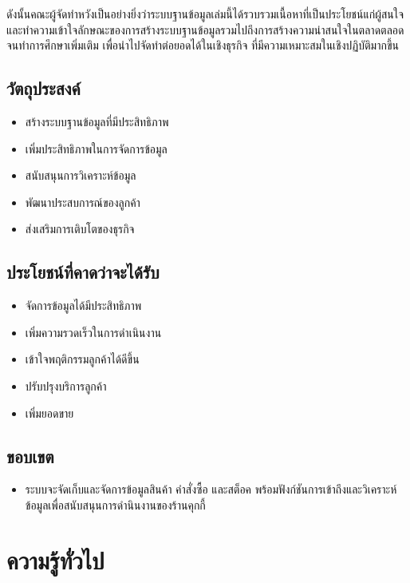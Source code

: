 \documentclass{report}
\begin{document}
ดังนั้นคณะผู้จัดทําหวังเป็นอย่างยิ่งว่าระบบฐานข้อมูลเล่มนี้ได้รวบรวมเนื้อหาที่เป็นประโยชน์แก่ผู้สนใจ และทําความเข้าใจลักษณะของการสร้างระบบฐานข้อมูลรวมไปถึงการสร้างความน่าสนใจในตลาดตลอดจนทําการศึกษาเพิ่มเติม เพื่อนำไปจัดทำต่อยอดได้ในเชิงธุรกิจ ที่มีความเหมาะสมในเชิงปฏิบัติมากขึ้น

\section{วัตถุประสงค์}
\begin{itemize} 
	\item สร้างระบบฐานข้อมูลที่มีประสิทธิภาพ
	\item เพิ่มประสิทธิภาพในการจัดการข้อมูล
	\item สนับสนุนการวิเคราะห์ข้อมูล
	\item พัฒนาประสบการณ์ของลูกค้า
	\item ส่งเสริมการเติบโตของธุรกิจ
\end{itemize}
\section{ประโยชน์ที่คาดว่าจะได้รับ}
\begin{itemize}
    \item จัดการข้อมูลได้มีประสิทธิภาพ
    \item เพิ่มความรวดเร็วในการดำเนินงาน
    \item เข้าใจพฤติกรรมลูกค้าได้ดีขึ้น
    \item ปรับปรุงบริการลูกค้า
    \item เพิ่มยอดขาย
\end{itemize}
\section{ขอบเขต}
\begin{itemize}
    \item{ระบบจะจัดเก็บและจัดการข้อมูลสินค้า คำสั่งซื้อ และสต็อค พร้อมฟังก์ชันการเข้าถึงและวิเคราะห์ข้อมูลเพื่อสนับสนุนการดํานินงานของร้านคุกกี้ }
\end{itemize}

\chapter{ความรู้ทั่วไป}
\end{document}
